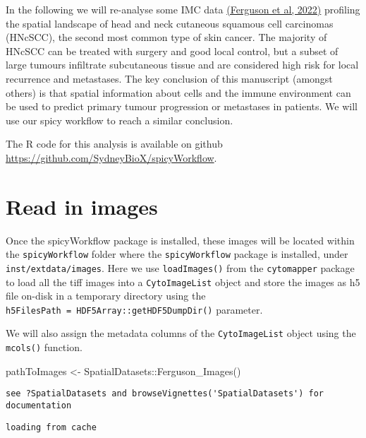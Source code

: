 \documentclass[
  letterpaper,
  DIV=11,
  numbers=noendperiod]{scrreprt}
\newenvironment{Shaded}{\begin{snugshade}}{\end{snugshade}}
\newcommand{\FunctionTok}[1]{\textcolor[rgb]{0.28,0.35,0.67}{#1}}
\newcommand{\NormalTok}[1]{\textcolor[rgb]{0.00,0.23,0.31}{#1}}
\newcommand{\OtherTok}[1]{\textcolor[rgb]{0.00,0.23,0.31}{#1}}
\newcommand{\SpecialCharTok}[1]{\textcolor[rgb]{0.37,0.37,0.37}{#1}}
\begin{document}
In the following we will re-analyse some IMC data
\href{https://doi.org/10.1158/1078-0432.CCR-22-1332}{(Ferguson et al,
2022)} profiling the spatial landscape of head and neck cutaneous
squamous cell carcinomas (HNcSCC), the second most common type of skin
cancer. The majority of HNcSCC can be treated with surgery and good
local control, but a subset of large tumours infiltrate subcutaneous
tissue and are considered high risk for local recurrence and metastases.
The key conclusion of this manuscript (amongst others) is that spatial
information about cells and the immune environment can be used to
predict primary tumour progression or metastases in patients. We will
use our spicy workflow to reach a similar conclusion.

The R code for this analysis is available on github
\url{https://github.com/SydneyBioX/spicyWorkflow}.

\section{Read in images}\label{read-in-images}

Once the spicyWorkflow package is installed, these images will be
located within the \texttt{spicyWorkflow} folder where the
\texttt{spicyWorkflow} package is installed, under
\texttt{inst/extdata/images}. Here we use \texttt{loadImages()} from the
\texttt{cytomapper} package to load all the tiff images into a
\texttt{CytoImageList} object and store the images as h5 file on-disk in
a temporary directory using the
\texttt{h5FilesPath\ =\ HDF5Array::getHDF5DumpDir()} parameter.

We will also assign the metadata columns of the \texttt{CytoImageList}
object using the \texttt{mcols()} function.

\begin{Shaded}
\begin{Highlighting}[]
\NormalTok{pathToImages }\OtherTok{\textless{}{-}}\NormalTok{ SpatialDatasets}\SpecialCharTok{::}\FunctionTok{Ferguson\_Images}\NormalTok{()}
\end{Highlighting}
\end{Shaded}

\begin{verbatim}
see ?SpatialDatasets and browseVignettes('SpatialDatasets') for documentation
\end{verbatim}

\begin{verbatim}
loading from cache
\end{verbatim}
\end{document}
